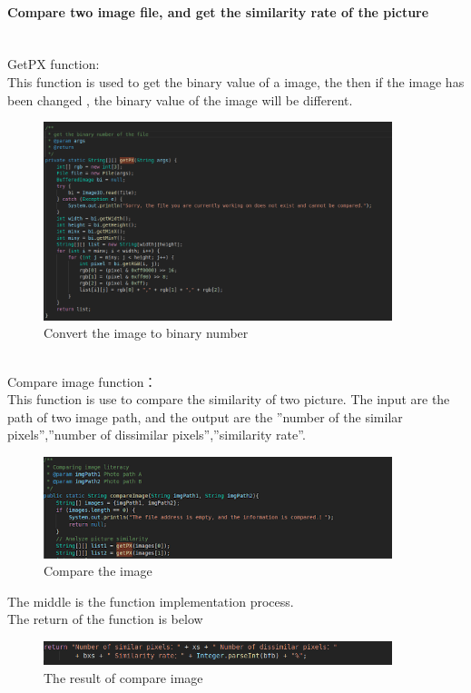 \documentclass[12pt,a4]{article}
\begin{document}
\paragraph{Compare two image file, and get the similarity rate of the picture}~{}
\newline
\\
GetPX function:\\
This function is used to get the binary value of a image, the then
if the image has been changed , the binary value of the image will be different.
\begin{figure}[h]%
		\centering  %
		\includegraphics[width=4in]{figure/4211}  	%
		\caption{Convert the image to binary number}   %
		\end{figure}
\\Compare image function：\\
This function is use to compare the similarity of two picture. The input are the path of two image path, and the output are the ”number of the similar pixels”,”number of dissimilar pixels”,”similarity rate”.
\begin{figure}[h]%
		\centering  %
		\includegraphics[width=4in]{figure/4212}  	%
		\caption{Compare the image}   %
		\end{figure}
The middle is the function implementation process. \\
The return of the function is below
\begin{figure}[h]%
		\centering  %
		\includegraphics[width=4in]{figure/421333}  	%
		\caption{The result of compare image}   %
		\end{figure}
\end{document}
